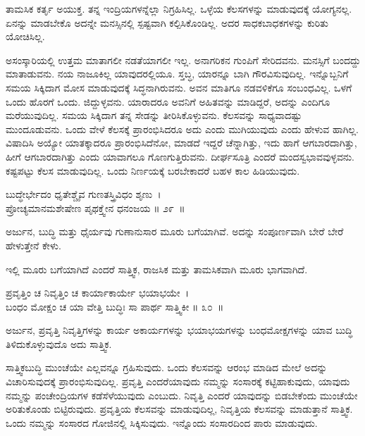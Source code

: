 ತಾಮಸಿಕ ಕರ್ತೃ ಅಯುಕ್ತ. ತನ್ನ ಇಂದ್ರಿಯಗಳನ್ನೆಲ್ಲಾ ನಿಗ್ರಹಿಸಿಲ್ಲ. ಒಳ್ಳೆಯ ಕೆಲಸಗಳನ್ನು ಮಾಡುವುದಕ್ಕೆ ಯೋಗ್ಯನಲ್ಲ. ಏನನ್ನು ಮಾಡಬೇಕೊ ಅದನ್ನೇ ಮನಸ್ಸಿನಲ್ಲಿ ಸ್ಪಷ್ಟವಾಗಿ ಕಲ್ಪಿಸಿಕೊಂಡಿಲ್ಲ. ಅದರ ಸಾಧಕಬಾಧಕಗಳನ್ನು ಕುರಿತು ಯೋಚಿಸಿಲ್ಲ.

ಅಸಂಸ್ಕಾರಿಯಲ್ಲಿ ಉತ್ತಮ ಮಾತಾಗಲೀ ನಡತೆಯಾಗಲೀ ಇಲ್ಲ. ಅನಾಗರಿಕನ ಗುಂಪಿಗೆ ಸೇರಿದವನು. ಮನಸ್ಸಿಗೆ ಬಂದದ್ದು ಮಾತಾಡುವನು. ನಯ ನಾಜೂಕಿಲ್ಲ ಯಾವುದರಲ್ಲಿಯೂ. ಸ್ತಬ್ಧ, ಯಾರನ್ನೂ ಬಾಗಿ ಗೌರವಿಸುವುದಿಲ್ಲ. ಇನ್ನೊಬ್ಬನಿಗೆ ಸಮಯ ಸಿಕ್ಕಿದಾಗ ಮೋಸ ಮಾಡುವುದಕ್ಕೆ ಸಿದ್ಧನಾಗಿರುವನು. ಅವನ ಮಾತಿಗೂ ನಡವಳಿಕೆಗೂ ಸಂಬಂಧವಿಲ್ಲ. ಒಳಗೆ ಒಂದು ಹೊರಗೆ ಒಂದು. ಜಿದ್ದುಳ್ಳವನು. ಯಾರಾದರೂ ಅವನಿಗೆ ಅಹಿತವನ್ನು ಮಾಡಿದ್ದರೆ, ಅದನ್ನು ಎಂದಿಗೂ ಮರೆಯುವುದಿಲ್ಲ. ಸಮಯ ಸಿಕ್ಕಿದಾಗ ತನ್ನ ಸೇಡನ್ನು ತೀರಿಸಿಕೊಳ್ಳುವನು. ಕೆಲಸವನ್ನು ಸಾಧ್ಯವಾದಷ್ಟು ಮುಂದೂಡುವನು. ಒಂದು ವೇಳೆ ಕೆಲಸಕ್ಕೆ ಪ್ರಾರಂಭಿಸಿದರೂ ಅದು ಎಂದು ಮುಗಿಯುವುದು ಎಂದು ಹೇಳುವ ಹಾಗಿಲ್ಲ. ವಿಷಾದಿಸಿ ಅಯ್ಯೋ ಯಾತಕ್ಕಾದರೂ ಪ್ರಾರಂಭಿಸಿದೆನೋ, ಮಾಡದೆ ಇದ್ದರೆ ಚೆನ್ನಾಗಿತ್ತು, ಇದು ಹಾಗೆ ಆಗಬಾರದಾಗಿತ್ತು, ಹೀಗೆ ಆಗಬಾರದಾಗಿತ್ತು ಎಂದು ಯಾವಾಗಲೂ ಗೊಣಗುತ್ತಿರುವನು. ದೀರ್ಘಸೂತ್ರಿ ಎಂದರೆ ಮಂದ\-ಸ್ವಭಾವವುಳ್ಳವನು. ಕಷ್ಟಪಟ್ಟು ಕೆಲಸ ಮಾಡುವುದಿಲ್ಲ. ಒಂದು ನಿರ್ಣಯಕ್ಕೆ ಬರಬೇಕಾದರೆ ಬಹಳ ಕಾಲ ಹಿಡಿಯುವುದು.

\begin{shloka}
ಬುದ್ಧೇರ್ಭೇದಂ ಧೃತೇಶ್ಚೈವ ಗುಣತಸ್ತ್ರಿವಿಧಂ ಶೃಣು~।\\ಪ್ರೋಚ್ಯಮಾನಮಶೇಷೇಣ ಪೃಥಕ್ತ್ವೇನ ಧನಂಜಯ \hfill॥ ೨೯~॥
\end{shloka}

\begin{artha}
ಅರ್ಜುನ, ಬುದ್ಧಿ ಮತ್ತು ಧೈರ್ಯವು ಗುಣಾನುಸಾರ ಮೂರು ಬಗೆಯಾಗಿವೆ. ಅದನ್ನು ಸಂಪೂರ್ಣವಾಗಿ ಬೇರೆ ಬೇರೆ ಹೇಳುತ್ತೇನೆ ಕೇಳು.
\end{artha}

ಇಲ್ಲಿ ಮೂರು ಬಗೆಯಾಗಿದೆ ಎಂದರೆ ಸಾತ್ತ್ವಿಕ, ರಾಜಸಿಕ ಮತ್ತು ತಾಮಸಿಕವಾಗಿ ಮೂರು ಭಾಗವಾಗಿದೆ.

\begin{shloka}
ಪ್ರವೃತ್ತಿಂ ಚ ನಿವೃತ್ತಿಂ ಚ ಕಾರ್ಯಾಕಾರ್ಯೇ ಭಯಾಭಯೇ~।\\ಬಂಧಂ ಮೋಕ್ಷಂ ಚ ಯಾ ವೇತ್ತಿ ಬುದ್ಧಿಃ ಸಾ ಪಾರ್ಥ ಸಾತ್ತ್ವಿಕೀ \hfill॥ ೩೦~॥
\end{shloka}

\begin{artha}
ಅರ್ಜುನ, ಪ್ರವೃತ್ತಿ ನಿವೃತ್ತಿಗಳನ್ನು ಕಾರ್ಯ ಅಕಾರ್ಯಗಳನ್ನು ಭಯಾಭಯಗಳನ್ನು ಬಂಧಮೋಕ್ಷಗಳನ್ನು ಯಾವ ಬುದ್ಧಿ ತಿಳಿದುಕೊಳ್ಳುವುದೊ ಅದು ಸಾತ್ತ್ವಿಕ.
\end{artha}

ಸಾತ್ತ್ವಿಕಬುದ್ಧಿ ಮುಂಚೆಯೇ ಎಲ್ಲವನ್ನೂ ಗ್ರಹಿಸುವುದು. ಒಂದು ಕೆಲಸವನ್ನು ಆರಂಭ ಮಾಡಿದ ಮೇಲೆ ಅದನ್ನು ವಿಚಾರಿಸುವುದಕ್ಕೆ ಪ್ರಾರಂಭಿಸುವುದಿಲ್ಲ. ಪ್ರವೃತ್ತಿ ಎಂದರೆ\break ಯಾವುದು ನಮ್ಮನ್ನು ಸಂಸಾರಕ್ಕೆ ಕಟ್ಟಿಹಾಕುವುದು, ಯಾವುದು ನಮ್ಮನ್ನು ಪಂಚೇಂದ್ರಿಯಗಳ ಕಡೆ\break ಸೆಳೆಯುವುದು ಎಂಬುದು. ನಿವೃತ್ತಿ ಎಂದರೆ ಯಾವುದನ್ನು ಬಿಡಬೇಕೆಂದು ಮುಂಚೆಯೇ ಅರಿತುಕೊಂಡು ಬಿಟ್ಟಿರುವುದು. ಪ್ರವೃತ್ತಿಯ ಕೆಲಸವನ್ನು ಮಾಡುವುದಿಲ್ಲ, ನಿವೃತ್ತಿಯ ಕೆಲಸವನ್ನು ಮಾಡುತ್ತಾನೆ ಸಾತ್ತ್ವಿಕ. ಒಂದು ನಮ್ಮನ್ನು ಸಂಸಾರದ ಗೋಜಿನಲ್ಲಿ ಸಿಕ್ಕಿಸುವುದು. ಇನ್ನೊಂದು ಸಂಸಾರದಿಂದ ಪಾರು ಮಾಡುವುದು.


